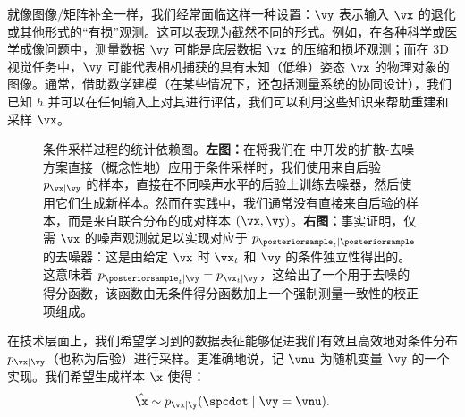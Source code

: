 \documentclass[../../book-main_zh.tex]{subfiles}
\begin{document}
就像图像/矩阵补全一样，我们经常面临这样一种设置：$\vy$ 表示输入 $\vx$ 的退化或其他形式的“有损”观测。这可以表现为截然不同的形式。例如，在各种科学或医学成像问题中，测量数据 $\vy$ 可能是底层数据 $\vx$ 的压缩和损坏观测；而在 3D 视觉任务中，$\vy$ 可能代表相机捕获的具有未知（低维）姿态 $\vx$ 的物理对象的图像。通常，借助数学建模（在某些情况下，还包括测量系统的协同设计），我们已知 $h$ 并可以在任何输入上对其进行评估，我们可以利用这些知识来帮助重建和采样 $\vx$。

\begin{figure}[t]
    \centering
    \begin{subfigure}{0.45\textwidth}
        \vspace{0.75cm}
        \centering
        \vspace{0.75cm}
        \caption{}
        \label{fig:left}
    \end{subfigure}
    \hfill
    \begin{subfigure}{0.45\textwidth}
        \centering
        \caption{}
        \label{fig:right}
    \end{subfigure}
    \caption{条件采样过程的统计依赖图。\textbf{左图：}在将我们在  中开发的扩散-去噪方案直接（概念性地）应用于条件采样时，我们使用来自后验 $p_{\vx \mid \vy}$ 的样本，直接在不同噪声水平的后验上训练去噪器，然后使用它们生成新样本。然而在实践中，我们通常没有直接来自后验的样本，而是来自联合分布的成对样本 $(\vx, \vy)$。\textbf{右图：}事实证明，仅需 $\vx$ 的噪声观测就足以实现对应于 $p_{\posteriorsample_t \mid \posteriorsample}$ 的去噪器：这是由给定 $\vx$ 时 $\vx_t$ 和 $\vy$ 的条件独立性得出的。这意味着 $p_{\posteriorsample_t \mid \vy} = p_{\vx_t \mid \vy}$，这给出了一个用于去噪的得分函数，该函数由无条件得分函数加上一个强制测量一致性的校正项组成。}
    \label{fig:posterior-sampling-cds}
\end{figure}

在技术层面上，我们希望学习到的数据表征能够促进我们有效且高效地对条件分布 $p_{\vx\mid \vy}$（也称为后验）进行采样。更准确地说，记 $\vnu$ 为随机变量 $\vy$ 的一个实现。我们希望生成样本 $\hat{\x}$ 使得：
\begin{equation}\label{eq:goal-sample-posterior}
    \hat{\x} \sim   p_{\vx \mid \y}(\spcdot \mid \vy=\vnu).
\end{equation}
\end{document}
